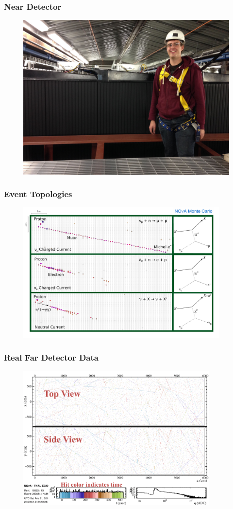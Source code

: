 \documentclass[10pt,professionalfonts,xcolor=table]{beamer}
\begin{document}
\frame
{
  \frametitle{Near Detector}
	\begin{figure} \includegraphics[height=0.55\textwidth]{figures/det_photos/meND_small.jpg} \end{figure}
}

\frame
{
  \frametitle{Event Topologies}

 \begin{figure} \includegraphics[width=0.95\textwidth]{figures/figures/event_topology_nue.pdf} \end{figure}
}


\frame
{
  \frametitle{Real Far Detector Data}

 \begin{figure} \includegraphics[width=0.9\textwidth]{figures/evd_steps/evd_top_side.png} \end{figure}
}
\end{document}
